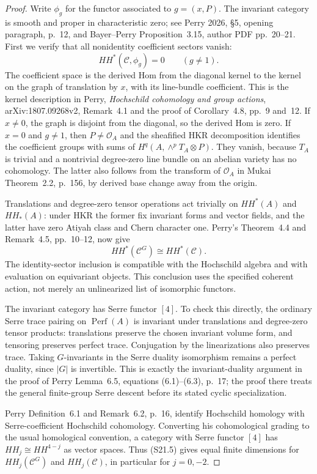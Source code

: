 \begin{proof}
Write $\phi_g$ for the functor associated to $g=(x,P)$.
The invariant category is smooth and proper in characteristic
zero; see Perry 2026, \S5, opening paragraph, p.~12,
and Bayer--Perry Proposition~3.15, author PDF pp.~20--21.
First we verify that all nonidentity coefficient sectors vanish:
\[
 HH^*(\mathcal C,\phi_g)=0\qquad(g\ne1).
 \tag{S21.4}
\]
The coefficient space is the derived Hom from the diagonal
kernel to the kernel on the graph of translation by $x$,
with its line-bundle coefficient. This is the kernel
description in Perry, \emph{Hochschild cohomology and group
actions}, arXiv:1807.09268v2, Remark~4.1 and the proof of
Corollary~4.8, pp.~9 and~12. If $x\ne0$, the graph is
disjoint from the diagonal, so the derived Hom is zero.
If $x=0$ and $g\ne1$, then $P\ne\mathcal O_A$ and
the sheafified HKR decomposition identifies the coefficient
groups with sums of
$H^q(A,\wedge^pT_A\otimes P)$.
They vanish, because $T_A$ is trivial and a nontrivial
degree-zero line bundle on an abelian variety has no
cohomology. The latter also follows from the transform of
$\mathcal O_A$ in Mukai Theorem~2.2, p.~156, by derived
base change away from the origin.

Translations and degree-zero tensor operations act trivially
on $HH^*(A)$ and $HH_*(A)$: under HKR the former fix invariant
forms and vector fields, and the latter have zero Atiyah
class and Chern character one. Perry's Theorem~4.4 and
Remark~4.5, pp.~10--12, now give
\[
 HH^*(\mathcal C^G)\cong HH^*(\mathcal C).
 \tag{S21.5}
\]
The identity-sector inclusion is compatible with the
Hochschild algebra and with evaluation on equivariant objects.
This conclusion uses the specified coherent action, not
merely an unlinearized list of isomorphic functors.

The invariant category has Serre functor $[4]$.
To check this directly, the ordinary Serre trace pairing on
$\operatorname{Perf}(A)$ is invariant under translations
and degree-zero tensor products: translations preserve the
chosen invariant volume form, and tensoring preserves
perfect trace. Conjugation by the linearizations also
preserves trace. Taking $G$-invariants in the Serre duality
isomorphism remains a perfect duality, since $|G|$ is
invertible. This is exactly the invariant-duality argument
in the proof of Perry Lemma~6.5, equations (6.1)--(6.3),
p.~17; the proof there treats the general finite-group
Serre descent before its stated cyclic specialization.

Perry Definition~6.1 and Remark~6.2, p.~16, identify
Hochschild homology with Serre-coefficient Hochschild
cohomology. Converting his cohomological grading to the
usual homological convention, a category with Serre functor
$[4]$ has $HH_j\cong HH^{4-j}$ as vector spaces.
Thus (S21.5) gives equal finite dimensions for
$HH_j(\mathcal C^G)$ and $HH_j(\mathcal C)$, in particular
for $j=0,-2$.


\end{proof}
